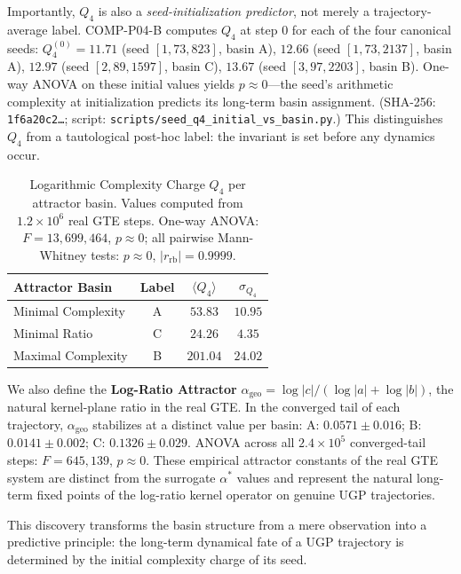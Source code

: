 \documentclass[11pt]{article}
\begin{document}
Importantly, $Q_4$ is also a \emph{seed-initialization predictor}, not merely a trajectory-average label. COMP-P04-B computes $Q_4$ at step 0 for each of the four canonical seeds: $Q_4^{(0)} = 11.71$ (seed $[1,73,823]$, basin A), $12.66$ (seed $[1,73,2137]$, basin A), $12.97$ (seed $[2,89,1597]$, basin C), $13.67$ (seed $[3,97,2203]$, basin B). One-way ANOVA on these initial values yields $p \approx 0$---the seed's arithmetic complexity at initialization predicts its long-term basin assignment. (SHA-256: \texttt{1f6a20c2\dots}; script: \texttt{scripts/seed\_q4\_initial\_vs\_basin.py}.) This distinguishes $Q_4$ from a tautological post-hoc label: the invariant is set before any dynamics occur.

\begin{table}[H]
    \centering
    \caption{Logarithmic Complexity Charge $Q_4$ per attractor basin. Values computed from $1.2 \times 10^6$ real GTE steps. One-way ANOVA: $F = 13{,}699{,}464$, $p \approx 0$; all pairwise Mann-Whitney tests: $p \approx 0$, $|r_{\text{rb}}| = 0.9999$.}
    \label{tab:log_charge}
    \renewcommand{\arraystretch}{1.2}
    \begin{tabular}{@{}lccc@{}}
        \toprule
        \textbf{Attractor Basin} & \textbf{Label} & \textbf{$\langle Q_4 \rangle$} & \textbf{$\sigma_{Q_4}$} \\
        \midrule
        Minimal Complexity & A & $53.83$ & $10.95$ \\
        Minimal Ratio & C & $24.26$ & $4.35$ \\
        Maximal Complexity & B & $201.04$ & $24.02$ \\
        \bottomrule
    \end{tabular}
\end{table}

We also define the \textbf{Log-Ratio Attractor} $\alpha_\text{geo} = \log|c| / (\log|a| + \log|b|)$, the natural kernel-plane ratio in the real GTE. In the converged tail of each trajectory, $\alpha_\text{geo}$ stabilizes at a distinct value per basin: A: $0.0571 \pm 0.016$; B: $0.0141 \pm 0.002$; C: $0.1326 \pm 0.029$. ANOVA across all $2.4 \times 10^5$ converged-tail steps: $F = 645{,}139$, $p \approx 0$. These empirical attractor constants of the real GTE system are distinct from the surrogate $\alpha^*$ values and represent the natural long-term fixed points of the log-ratio kernel operator on genuine UGP trajectories.

This discovery transforms the basin structure from a mere observation into a predictive principle: the long-term dynamical fate of a UGP trajectory is determined by the initial complexity charge of its seed.
\end{document}
